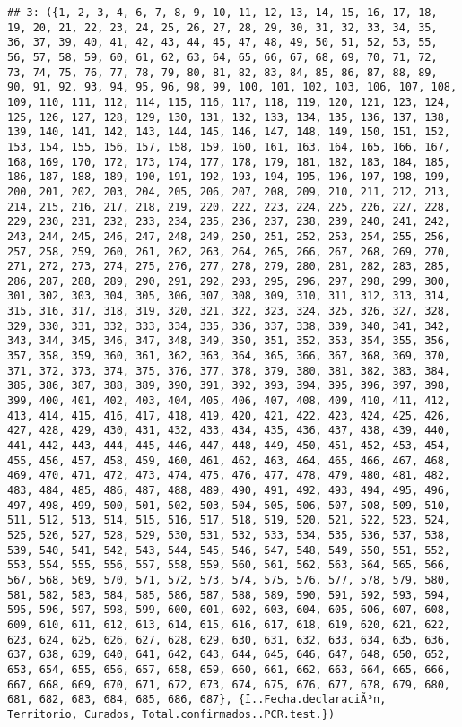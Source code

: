 \documentclass[
]{book}
\begin{document}
\begin{verbatim}
## 3: ({1, 2, 3, 4, 6, 7, 8, 9, 10, 11, 12, 13, 14, 15, 16, 17, 18, 19, 20, 21, 22, 23, 24, 25, 26, 27, 28, 29, 30, 31, 32, 33, 34, 35, 36, 37, 39, 40, 41, 42, 43, 44, 45, 47, 48, 49, 50, 51, 52, 53, 55, 56, 57, 58, 59, 60, 61, 62, 63, 64, 65, 66, 67, 68, 69, 70, 71, 72, 73, 74, 75, 76, 77, 78, 79, 80, 81, 82, 83, 84, 85, 86, 87, 88, 89, 90, 91, 92, 93, 94, 95, 96, 98, 99, 100, 101, 102, 103, 106, 107, 108, 109, 110, 111, 112, 114, 115, 116, 117, 118, 119, 120, 121, 123, 124, 125, 126, 127, 128, 129, 130, 131, 132, 133, 134, 135, 136, 137, 138, 139, 140, 141, 142, 143, 144, 145, 146, 147, 148, 149, 150, 151, 152, 153, 154, 155, 156, 157, 158, 159, 160, 161, 163, 164, 165, 166, 167, 168, 169, 170, 172, 173, 174, 177, 178, 179, 181, 182, 183, 184, 185, 186, 187, 188, 189, 190, 191, 192, 193, 194, 195, 196, 197, 198, 199, 200, 201, 202, 203, 204, 205, 206, 207, 208, 209, 210, 211, 212, 213, 214, 215, 216, 217, 218, 219, 220, 222, 223, 224, 225, 226, 227, 228, 229, 230, 231, 232, 233, 234, 235, 236, 237, 238, 239, 240, 241, 242, 243, 244, 245, 246, 247, 248, 249, 250, 251, 252, 253, 254, 255, 256, 257, 258, 259, 260, 261, 262, 263, 264, 265, 266, 267, 268, 269, 270, 271, 272, 273, 274, 275, 276, 277, 278, 279, 280, 281, 282, 283, 285, 286, 287, 288, 289, 290, 291, 292, 293, 295, 296, 297, 298, 299, 300, 301, 302, 303, 304, 305, 306, 307, 308, 309, 310, 311, 312, 313, 314, 315, 316, 317, 318, 319, 320, 321, 322, 323, 324, 325, 326, 327, 328, 329, 330, 331, 332, 333, 334, 335, 336, 337, 338, 339, 340, 341, 342, 343, 344, 345, 346, 347, 348, 349, 350, 351, 352, 353, 354, 355, 356, 357, 358, 359, 360, 361, 362, 363, 364, 365, 366, 367, 368, 369, 370, 371, 372, 373, 374, 375, 376, 377, 378, 379, 380, 381, 382, 383, 384, 385, 386, 387, 388, 389, 390, 391, 392, 393, 394, 395, 396, 397, 398, 399, 400, 401, 402, 403, 404, 405, 406, 407, 408, 409, 410, 411, 412, 413, 414, 415, 416, 417, 418, 419, 420, 421, 422, 423, 424, 425, 426, 427, 428, 429, 430, 431, 432, 433, 434, 435, 436, 437, 438, 439, 440, 441, 442, 443, 444, 445, 446, 447, 448, 449, 450, 451, 452, 453, 454, 455, 456, 457, 458, 459, 460, 461, 462, 463, 464, 465, 466, 467, 468, 469, 470, 471, 472, 473, 474, 475, 476, 477, 478, 479, 480, 481, 482, 483, 484, 485, 486, 487, 488, 489, 490, 491, 492, 493, 494, 495, 496, 497, 498, 499, 500, 501, 502, 503, 504, 505, 506, 507, 508, 509, 510, 511, 512, 513, 514, 515, 516, 517, 518, 519, 520, 521, 522, 523, 524, 525, 526, 527, 528, 529, 530, 531, 532, 533, 534, 535, 536, 537, 538, 539, 540, 541, 542, 543, 544, 545, 546, 547, 548, 549, 550, 551, 552, 553, 554, 555, 556, 557, 558, 559, 560, 561, 562, 563, 564, 565, 566, 567, 568, 569, 570, 571, 572, 573, 574, 575, 576, 577, 578, 579, 580, 581, 582, 583, 584, 585, 586, 587, 588, 589, 590, 591, 592, 593, 594, 595, 596, 597, 598, 599, 600, 601, 602, 603, 604, 605, 606, 607, 608, 609, 610, 611, 612, 613, 614, 615, 616, 617, 618, 619, 620, 621, 622, 623, 624, 625, 626, 627, 628, 629, 630, 631, 632, 633, 634, 635, 636, 637, 638, 639, 640, 641, 642, 643, 644, 645, 646, 647, 648, 650, 652, 653, 654, 655, 656, 657, 658, 659, 660, 661, 662, 663, 664, 665, 666, 667, 668, 669, 670, 671, 672, 673, 674, 675, 676, 677, 678, 679, 680, 681, 682, 683, 684, 685, 686, 687}, {ï..Fecha.declaraciÃ³n, Territorio, Curados, Total.confirmados..PCR.test.})

\end{verbatim}
\end{document}
